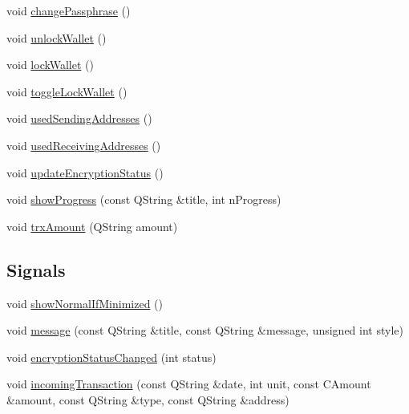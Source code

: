 \begin{DoxyCompactItemize}
\item 
void \mbox{\hyperlink{class_wallet_view_a36699c31e256becb2afd92f834830ba0}{change\+Passphrase}} ()
\item 
void \mbox{\hyperlink{class_wallet_view_ac258d549f0e55ad4f84b9d21848faf02}{unlock\+Wallet}} ()
\item 
void \mbox{\hyperlink{class_wallet_view_ae76bd29c36d1cfa9bc986924a0454eeb}{lock\+Wallet}} ()
\item 
void \mbox{\hyperlink{class_wallet_view_a739b3c92d336efb3cf1249a84d4deeab}{toggle\+Lock\+Wallet}} ()
\item 
void \mbox{\hyperlink{class_wallet_view_a6f0d012c18ea2df7336c852abe2a50d0}{used\+Sending\+Addresses}} ()
\item 
void \mbox{\hyperlink{class_wallet_view_accb5d9e2789c62e03ad1723518d31c02}{used\+Receiving\+Addresses}} ()
\item 
void \mbox{\hyperlink{class_wallet_view_ad348f2ed9f843ef9125ca416307c7412}{update\+Encryption\+Status}} ()
\item 
void \mbox{\hyperlink{class_wallet_view_a8a1f4b689abc0f1073c547ec1f871a26}{show\+Progress}} (const Q\+String \&title, int n\+Progress)
\item 
void \mbox{\hyperlink{class_wallet_view_ac4206b008b9c16dd6931aa56d9fb6fd4}{trx\+Amount}} (Q\+String amount)
\end{DoxyCompactItemize}
\subsection*{Signals}
\begin{DoxyCompactItemize}
\item 
void \mbox{\hyperlink{class_wallet_view_aac71ea140f87cd60081b56e579b6fa0c}{show\+Normal\+If\+Minimized}} ()
\item 
void \mbox{\hyperlink{class_wallet_view_a901527bc1086ef5443a264af651de178}{message}} (const Q\+String \&title, const Q\+String \&message, unsigned int style)
\item 
void \mbox{\hyperlink{class_wallet_view_a98ed22bbde34c1e614e60ecd0b07f03b}{encryption\+Status\+Changed}} (int status)
\item 
void \mbox{\hyperlink{class_wallet_view_aa2348613d312c4c762d3e8100bd38067}{incoming\+Transaction}} (const Q\+String \&date, int unit, const C\+Amount \&amount, const Q\+String \&type, const Q\+String \&address)
\end{DoxyCompactItemize}
